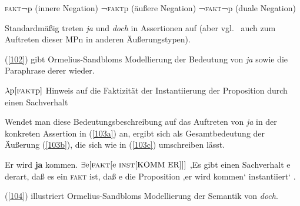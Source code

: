 \begin{exe}
	\ex\label{101} 
		\begin{xlist}	
			\ex\label{101a} \textsc{fakt}¬p (innere Negation)
			\ex\label{101b} ¬\textsc{fakt}p (äußere Negation)
			\ex\label{101c} ¬\textsc{fakt}¬p (duale Negation)
		\end{xlist}
\end{exe}
Standardmäßig treten \textit{ja} und \textit{doch} in Assertionen auf (aber vgl.\ \citealt[87--92]{Ormelius-Sandblom1997} auch zum Auftreten dieser MPn in anderen Äußerungstypen). 

(\ref{102}) gibt Ormelius-Sandbloms Modellierung der Bedeutung von \textit{ja} sowie die Paraphrase derer wieder.

\begin{exe}
	\ex\label{102} 
		\begin{xlist}	
			\ex\label{102a} $\lambda \textrm{p[\textsc{fakt}p]}$
			\ex\label{102b} Hinweis auf die Faktizität der Instantiierung der Proposition durch einen Sachverhalt 
			\hfill\hbox{\citet[82]{Ormelius-Sandblom1997}}
		\end{xlist}
\end{exe}
Wendet man diese Bedeutungsbeschreibung auf das Auftreten von \textit{ja} in der konkreten Assertion in (\ref{103a}) an, ergibt sich als Gesamtbedeutung der Äußerung (\ref{103b}), die sich wie in (\ref{103c}) umschreiben lässt.
\begin{exe}
	\ex\label{103} 
		\begin{xlist}	
			\ex\label{103a} Er wird \textbf{ja} kommen.  
			\ex\label{103b} $\exists \textrm{e} [\textrm{\textsc{fakt}}[\textrm{e} \ \textrm{\textsc{inst}}[\textrm{KOMM ER}]]]$
			\ex\label{103c} ‚Es gibt einen Sachverhalt e derart, daß es ein \textsc{fakt} ist, daß e die Proposition ‚er wird kommen‘ instantiiert‘ 			{}.                                    
			\hfill\hbox{\citet[89]{Ormelius-Sandblom1997}}
		\end{xlist}		
\end{exe}
(\ref{104}) illustriert Ormelius-Sandbloms Modellierung der Semantik von \textit{doch}.

